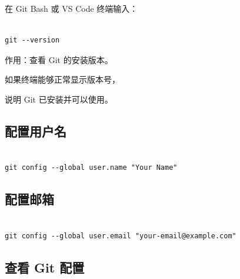 在 Git Bash 或 VS Code 终端输入：



\begin{lstlisting}

git --version

\end{lstlisting}



作用：查看 Git 的安装版本。



如果终端能够正常显示版本号，

说明 Git 已安装并可以使用。



\subsection{配置用户名}



\begin{lstlisting}

git config --global user.name "Your Name"

\end{lstlisting}








\subsection{配置邮箱}



\begin{lstlisting}

git config --global user.email "your-email@example.com"

\end{lstlisting}








\subsection{查看 Git 配置}




